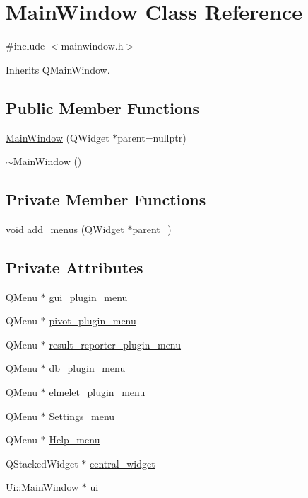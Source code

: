 \hypertarget{classMainWindow}{}\section{Main\+Window Class Reference}
\label{classMainWindow}


{\ttfamily \#include $<$mainwindow.\+h$>$}



Inherits Q\+Main\+Window.

\subsection*{Public Member Functions}
\begin{DoxyCompactItemize}
\item 
\hyperlink{classMainWindow_a996c5a2b6f77944776856f08ec30858d}{Main\+Window} (Q\+Widget $\ast$parent=nullptr)
\item 
\hyperlink{classMainWindow_ae98d00a93bc118200eeef9f9bba1dba7}{$\sim$\+Main\+Window} ()
\end{DoxyCompactItemize}
\subsection*{Private Member Functions}
\begin{DoxyCompactItemize}
\item 
void \hyperlink{classMainWindow_a465314c6317877838dfe332838be19b2}{add\+\_\+menus} (Q\+Widget $\ast$parent\+\_\+)
\end{DoxyCompactItemize}
\subsection*{Private Attributes}
\begin{DoxyCompactItemize}
\item 
Q\+Menu $\ast$ \hyperlink{classMainWindow_a4844d3dbe9895a5e2e9dd86e44ebc68c}{gui\+\_\+plugin\+\_\+menu}
\item 
Q\+Menu $\ast$ \hyperlink{classMainWindow_a919b4e91bffc528a3a179066e764b585}{pivot\+\_\+plugin\+\_\+menu}
\item 
Q\+Menu $\ast$ \hyperlink{classMainWindow_a7e9ebcb30a5c1b52b333667d1846c39b}{result\+\_\+reporter\+\_\+plugin\+\_\+menu}
\item 
Q\+Menu $\ast$ \hyperlink{classMainWindow_a0124119ae5ce14b59e7ab9a93aae5c36}{db\+\_\+plugin\+\_\+menu}
\item 
Q\+Menu $\ast$ \hyperlink{classMainWindow_a27f95fb7021c28fafdef73ed5bddb225}{elmelet\+\_\+plugin\+\_\+menu}
\item 
Q\+Menu $\ast$ \hyperlink{classMainWindow_af9d894ce80a9a3beb435198d7c7bcb8d}{Settings\+\_\+menu}
\item 
Q\+Menu $\ast$ \hyperlink{classMainWindow_a2068ab7a73c3d08e80b4a2b2c7382388}{Help\+\_\+menu}
\item 
Q\+Stacked\+Widget $\ast$ \hyperlink{classMainWindow_a257f380476b4629d8a0b85fc3bca970e}{central\+\_\+widget}
\item 
Ui\+::\+Main\+Window $\ast$ \hyperlink{classMainWindow_a35466a70ed47252a0191168126a352a5}{ui}
\end{DoxyCompactItemize}
